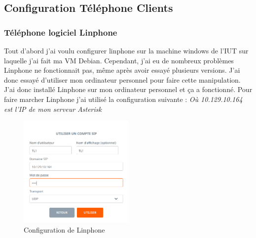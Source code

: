 \documentclass[12pt, a4paper]{article}
\begin{document}
\subsection{Configuration Téléphone Clients}
	\subsubsection{Téléphone logiciel Linphone}
	Tout d'abord j'ai voulu configurer linphone sur la machine windows de l'IUT
	sur laquelle j'ai fait ma VM Debian. Cependant, j'ai eu de nombreux problèmes
	Linphone ne fonctionnait pas, même après avoir essayé plusieurs versions. 
	J'ai donc essayé d'utiliser mon ordinateur personnel pour faire cette 
	manipulation. J'ai donc installé Linphone sur mon ordinateur personnel et 
	ça a fonctionné. Pour faire marcher Linphone j'ai utilisé la configuration suivante : \textit{Où 10.129.10.164 est l'IP de mon serveur Asterisk}
	\begin{figure}[h]
		\centering
		\includegraphics[width=0.5\textwidth]{img/linphone.png}
		\caption{Configuration de Linphone}
		\label{fig:lin}
	\end{figure}
\end{document}
